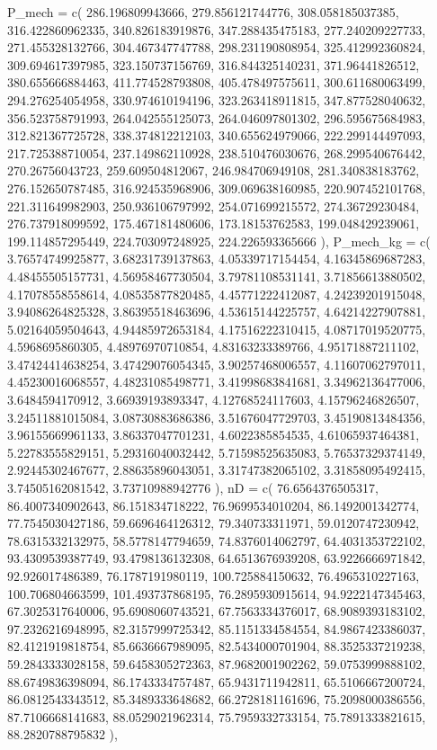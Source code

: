 \documentclass[
  letterpaper,
  DIV=11]{scrartcl}
\newenvironment{Shaded}{\begin{snugshade}}{\end{snugshade}}
\newcommand{\NormalTok}[1]{\textcolor[rgb]{0.00,0.23,0.31}{#1}}
\begin{document}
\begin{Shaded}
\begin{Highlighting}[]
\NormalTok{  \textasciigrave{}P\_mech\textasciigrave{} = c( 286.196809943666, 279.856121744776, 308.058185037385, 316.422860962335, 340.826183919876, 347.288435475183, 277.240209227733, 271.455328132766, 304.467347747788, 298.231190808954, 325.412992360824, 309.694617397985, 323.150737156769, 316.844325140231, 371.96441826512, 380.655666884463, 411.774528793808, 405.478497575611, 300.611680063499, 294.276254054958, 330.974610194196, 323.263418911815, 347.877528040632, 356.523758791993, 264.042555125073, 264.046097801302, 296.595675684983, 312.821367725728, 338.374812212103, 340.655624979066, 222.299144497093, 217.725388710054, 237.149862110928, 238.510476030676, 268.299540676442, 270.26756043723, 259.609504812067, 246.984706949108, 281.340838183762, 276.152650787485, 316.924535968906, 309.069638160985, 220.907452101768, 221.311649982903, 250.936106797992, 254.071699215572, 274.36729230484, 276.737918099592, 175.467181480606, 173.18153762583, 199.048429239061, 199.114857295449, 224.703097248925, 224.226593365666 ),}
\NormalTok{  \textasciigrave{}P\_mech\_kg\textasciigrave{} = c( 3.76574749925877, 3.68231739137863, 4.05339717154454, 4.16345869687283, 4.48455505157731, 4.56958467730504, 3.79781108531141, 3.71856613880502, 4.17078558558614, 4.08535877820485, 4.45771222412087, 4.24239201915048, 3.94086264825328, 3.86395518463696, 4.53615144225757, 4.64214227907881, 5.02164059504643, 4.94485972653184, 4.17516222310415, 4.08717019520775, 4.5968695860305, 4.48976970710854, 4.83163233389766, 4.95171887211102, 3.47424414638254, 3.47429076054345, 3.90257468006557, 4.11607062797011, 4.45230016068557, 4.48231085498771, 3.41998683841681, 3.34962136477006, 3.6484594170912, 3.66939193893347, 4.12768524117603, 4.15796246826507, 3.24511881015084, 3.08730883686386, 3.51676047729703, 3.45190813484356, 3.96155669961133, 3.86337047701231, 4.6022385854535, 4.61065937464381, 5.22783555829151, 5.29316040032442, 5.71598525635083, 5.76537329374149, 2.92445302467677, 2.88635896043051, 3.31747382065102, 3.31858095492415, 3.74505162081542, 3.73710988942776 ),}
\NormalTok{  \textasciigrave{}nD\textasciigrave{} = c( 76.6564376505317, 86.4007340902643, 86.151834718222, 76.9699534010204, 86.1492001342774, 77.7545030427186, 59.6696464126312, 79.340733311971, 59.0120747230942, 78.6315332132975, 58.5778147794659, 74.8376014062797, 64.4031353722102, 93.4309539387749, 93.4798136132308, 64.6513676939208, 63.9226666971842, 92.926017486389, 76.1787191980119, 100.725884150632, 76.4965310227163, 100.706804663599, 101.493737868195, 76.2895930915614, 94.9222147345463, 67.3025317640006, 95.6908060743521, 67.7563334376017, 68.9089393183102, 97.2326216948995, 82.3157999725342, 85.1151334584554, 84.9867423386037, 82.4121919818754, 85.6636667989095, 82.5434000701904, 88.3525337219238, 59.2843333028158, 59.6458305272363, 87.9682001902262, 59.0753999888102, 88.6749836398094, 86.1743334757487, 65.9431711942811, 65.5106667200724, 86.0812543343512, 85.3489333648682, 66.2728181161696, 75.2098000386556, 87.7106668141683, 88.0529021962314, 75.7959332733154, 75.7891333821615, 88.2820788795832 ),}

\end{Highlighting}
\end{Shaded}
\end{document}
